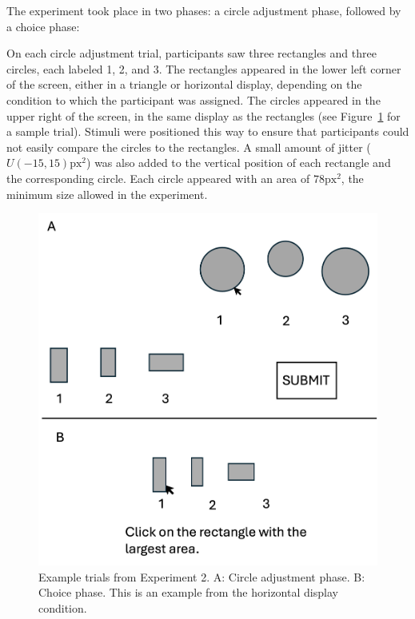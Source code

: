 The experiment took place in two phases: a circle adjustment phase, followed by a choice phase: 

On each circle adjustment trial, participants saw three rectangles and three circles, each labeled 1, 2, and 3. The rectangles appeared in the lower left corner of the screen, either in a triangle or horizontal display, depending on the condition to which the participant was assigned. The circles appeared in the upper right of the screen, in the same display as the rectangles (see Figure~\ref{fig:circle_exp_display} for a sample trial). Stimuli were positioned this way to ensure that participants could not easily compare the circles to the rectangles. A small amount of jitter ($U(-15,15)\text{px}^2$) was also added to the vertical position of each rectangle and the corresponding circle. Each circle appeared with an area of $78 \text{px}^2$, the minimum size allowed in the experiment. 

\begin{figure}
   \includegraphics[width=\linewidth]{figures/circle_exp_display.jpg}
   \caption{Example trials from Experiment 2. A: Circle adjustment phase. B: Choice phase. This is an example from the horizontal display condition.}
   \label{fig:circle_exp_display}
\end{figure}

